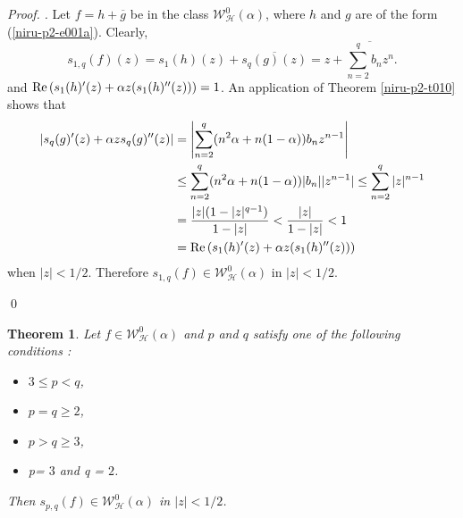 \documentclass[a4paper,12pt]{amsart}
\theoremstyle{plain}
\newtheorem{thm}[equation]{Theorem}
\theoremstyle{definition}
\newenvironment{pf}[1][]{ \vskip 3mm
 \noindent
 \ifthenelse{\equal{#1}{}}  {{\slshape Proof. }}  {{\slshape #1.} } }{\qed\bigskip}
\begin{document}
\begin{pf}
Let $f  = h + \overline{g}$ be in the class $\mathcal{W}^0_{\mathcal{H}}(\alpha)$, where $h$ and $g$ are of the form (\ref{niru-p2-e001a}). Clearly,
$$
s_{1,q}(f)(z) = s_1(h)(z) + \overline{s_q(g)(z)} = z + \overline {\sum_{n=2}^{q} b_n z^n}.
$$
and ${\rm Re\,}(s_1(h)'(z) + \alpha z(s_1(h)''(z))) =1$. An application of Theorem \ref{niru-p2-t010} shows that
\begin{align*}
\noindent |s_q(g)'(z) + \alpha z s_q(g)''(z)| &= \left|\sum_{n =2}^{q}(n^2 \alpha + n (1 - \alpha)) b_n z ^{n-1}\right|\\
& \leq \sum_{n =2}^{q}(n^2 \alpha + n (1 - \alpha))| b_n| |z ^{n-1}| \leq \sum_{n =2}^{q}|z| ^{n-1}\\
& = \frac{|z|(1 - |z|^{q-1})}{1 - |z|} < \frac{|z|}{1 - |z|} < 1 \\
& =  {\rm Re\,}(s_1(h)'(z) + \alpha z(s_1(h)''(z)))
\end{align*}
when $|z|< 1/2.$
Therefore  $s_{1,q}(f)\in\mathcal{W}^0_{\mathcal{H}}(\alpha)$ in  $|z|< 1/2.$

\end{pf}

\begin{thm}
Let $f\in\mathcal{W}^0_{\mathcal{H}}(\alpha)$ and $p$ and $q$ satisfy one of the following conditions :
\begin{itemize}
\item[(i)] $3 \leq p < q$,
\item[(ii)] $p = q \geq 2$,
\item[(iii)] $p> q \geq 3$,
\item[(iv)] p= $3$ and q = $2$.
\end{itemize}
Then $s_{p,q}(f)\in\mathcal{W}^0_{\mathcal{H}}(\alpha)$ in  $|z|< 1/2$.

\end{thm}
\end{document}
